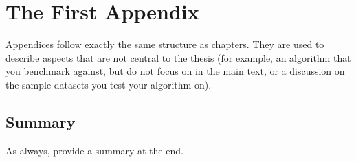 
\chapter{The First Appendix}
\label{app:appendix1}


Appendices follow exactly the same structure as chapters. They are used to describe aspects that are not central to the thesis (for example, an algorithm that you benchmark against, but do not focus on in the main text, or a discussion on the sample datasets you test your algorithm on).


\section{Summary}
\label{sec:appendix1:summary}

As always, provide a summary at the end.

